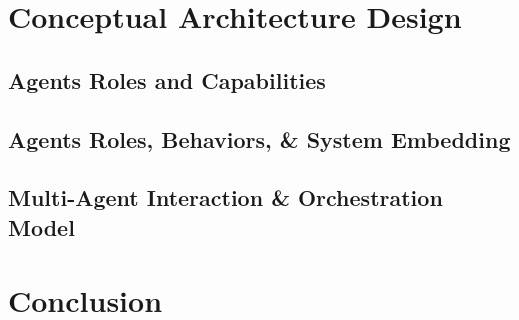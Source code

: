 \section{Conceptual Architecture Design}\label{sec:5architectDesign}
\subsection{Agents Roles and Capabilities}
\subsection{Agents Roles, Behaviors, \& System Embedding}
\subsection{Multi-Agent Interaction \& Orchestration Model}\label{sec:conceptualarchitecture}
\newpage 
\section{Conclusion}